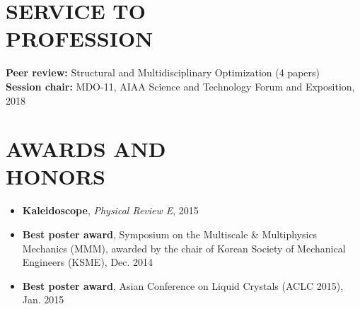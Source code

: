 \documentclass[margin, 10pt]{res} %
\begin{document}
\begin{resume}
\begin{enumerate}
\end{enumerate}

\section{SERVICE TO \\ PROFESSION}

\textbf{Peer review: }
Structural and Multidisciplinary Optimization (4 papers) \\
\textbf{Session chair: }
MDO-11, AIAA Science and Technology Forum and Exposition, 2018
\section{AWARDS AND \\ HONORS}
\begin{itemize}
    \item \textbf{Kaleidoscope}, \textit{Physical Review E}, 2015
    \item \textbf{Best poster award}, Symposium on the Multiscale \& Multiphysics Mechanics (MMM), awarded by the chair of Korean Society of Mechanical Engineers (KSME), Dec. 2014 
    \item \textbf{Best poster award}, Asian Conference on Liquid Crystals (ACLC 2015), Jan. 2015
\end{itemize}
    

\end{resume}
\end{document}
